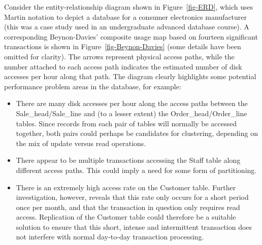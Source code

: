 \documentclass{CRPITStyle}
\begin{document}
Consider the entity-relationship diagram shown in Figure~\ref{fig-ERD},
which uses Martin notation \cite{Mart-J-1990-IE2} to depict a database
for a consumer electronics manufacturer (this was a case study used in
an undergraduate advanced database course). A corresponding
Beynon-Davies' composite usage map based on fourteen significant
transactions \cite{Pill-A-2005-DP} is shown in
Figure~\ref{fig-Beynon-Davies} (some details have been omitted for
clarity). The arrows represent physical access paths, while the number
attached to each access path indicates the estimated number of disk
accesses per hour along that path. The diagram clearly highlights some
potential performance problem areas in the database, for example:
\begin{itemize}

	\item There are many disk accesses per hour along the access paths
	between the \textsf{Sale\_head}/\textsf{Sale\_line} and (to a lesser
	extent) the \textsf{Order\_head}/\textsf{Order\_line} tables. Since
	records from each pair of tables will normally be accessed together,
	both pairs could perhaps be candidates for clustering, depending on
	the mix of update versus read operations.

	\item There appear to be multiple transactions accessing the
	\textsf{Staff} table along different access paths. This could imply
	a need for some form of partitioning.

	\item There is an extremely high access rate on the
	\textsf{Customer} table. Further investigation, however, reveals
	that this rate only occurs for a short period once per month, and
	that the transaction in question only requires read access.
	Replication of the \textsf{Customer} table could therefore be a
	suitable solution to ensure that this short, intense and
	intermittent transaction does not interfere with normal day-to-day
	transaction processing.
	
\end{itemize}
\end{document}
